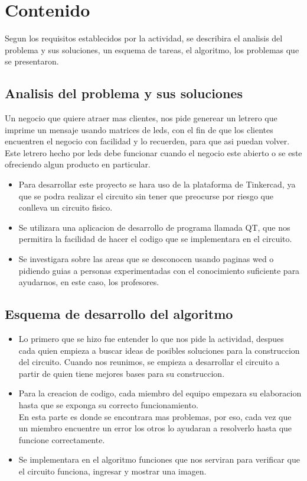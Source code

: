 \documentclass{article}
\begin{document}
\newpage

\section{Contenido} \label{contenido}
Segun los requisitos establecidos por la actividad, se describira el analisis del problema y sus soluciones, un esquema de tareas, el algoritmo, los problemas que se presentaron. 

\subsection{Analisis del problema y sus soluciones}
Un negocio que quiere atraer mas clientes, nos pide generear un letrero que imprime un mensaje usando matrices de leds, con el fin de que los clientes encuentren el negocio con facilidad y lo recuerden, para que asi puedan volver. Este letrero hecho por leds debe funcionar cuando el negocio este abierto o se este ofreciendo algun producto en particular.
\begin{itemize}
    \item Para desarrollar este proyecto se hara uso de la plataforma de Tinkercad, ya que se podra realizar el circuito sin tener que preocurse por riesgo que conlleva un circuito fisico.
    \item Se utilizara una aplicacion de desarrollo de programa llamada QT, que nos permitira la facilidad de hacer el codigo que se implementara en el circuito.
    \item Se investigara sobre las areas que se desconocen usando paginas wed o pidiendo guias a personas experimentadas con el conocimiento suficiente para ayudarnos, en este caso, los profesores.
\end{itemize}

\subsection{Esquema de desarrollo del algoritmo}
\begin{itemize}
    \item Lo primero que se hizo fue entender lo que nos pide la actividad, despues cada quien empieza a buscar ideas de posibles soluciones para la construccion del circuito. Cuando nos reunimos, se empieza a desarrollar el circuito a partir de quien tiene mejores bases para su construccion.
    \item Para la creacion de codigo, cada miembro del equipo empezara su elaboracion hasta que se exponga su correcto funcionamiento.\\ 
    En esta parte es donde se encontrara mas problemas, por eso, cada vez que un miembro encuentre un error los otros lo ayudaran a resolverlo hasta que funcione correctamente.
    \item Se implementara en el algoritmo funciones que nos serviran para verificar que el circuito funciona, ingresar y mostrar una imagen.
\end{itemize}
\end{document}
